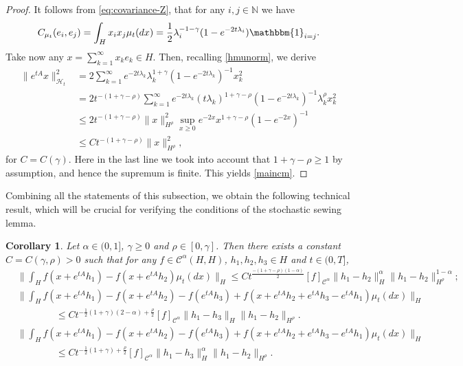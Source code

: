 \documentclass[11pt,a4paper]{article}
\newcommand{\cC}{\mathcal{C}}
\newcommand{\Op}{A}
\renewcommand{\H}{\mathcal{H}}
\newcommand{\I}{\mathbbm{1}}
\newcommand{\N}{\mathbb{N}}
\renewcommand{\ge}{\geqslant}
\renewcommand{\le}{\leqslant}
\numberwithin{equation}{section}
\theoremstyle{definition}
\theoremstyle{remark}
\theoremstyle{plain}
\newtheorem{corollary}[definition]{Corollary}
\begin{document}
\begin{proof}
It follows from \eqref{eq:covariance-Z}, that for any $i,j\in\N$ we have
\begin{equation*}
C_{\mu_t}(e_i,e_j)=\int_H x_i x_j \mu_t (dx)=\frac12\lambda_i^{-1-\gamma}(1-e^{-2t \lambda_i})\I_{i=j}.
\end{equation*}
Take now any $x=\sum_{k=1}^\infty x_k e_k\in H$. 
Then, recalling \eqref{hmunorm}, we derive
\begin{align*}
\|e^{t A} x\|^2_{\H_t}&=2\sum_{k=1}^\infty e^{-2 t \lambda_k}\lambda_k^{1+\gamma}(1-e^{-2t \lambda_k})^{-1} x_k^2\\
&= 2 t^{-(1+\gamma-\rho)}\sum_{k=1}^\infty e^{-2 t \lambda_k}(t \lambda_k)^{1+\gamma-\rho} (1-e^{-2t \lambda_k})^{-1} \lambda_k^{\rho} x_k^2\\
&\le 2  t^{-(1+\gamma-\rho)}\|x\|_{H^\rho}^2 \sup_{x\ge0} e^{-2 x}x^{1+\gamma-\rho} (1-e^{-2x })^{-1} \\
&\le C t^{-(1+\gamma-\rho)}\|x\|_{H^\rho}^2,
\end{align*}
for $C=C(\gamma)$. Here in the last line we took into account that $1+\gamma-\rho\ge1$ by assumption, and hence the supremum is finite. This yields \eqref{maincm}.
\end{proof}

Combining all the statements of this subsection, we obtain the following technical result, which will be crucial for verifying the conditions of the stochastic sewing lemma.

\begin{corollary}\label{cor:Holderreg}
Let $\alpha \in (0,1]$, $\gamma \geqslant 0$ and $\rho \in [0,\gamma]$. Then there exists a constant $C=C(\gamma,\rho)>0$ such that for any $f \in \cC^\alpha(H,H)$, $h_1,h_2,h_3\in H$ and $t \in (0,T]$,
    \begin{align} 
      &\Big\|\int_H f(x+e^{t\Op}h_1)-f(x+e^{t\Op}h_2)\mu_t(dx)\Big\|_{H} \leqslant C t^{\frac{-(1+\gamma-\rho)(1-\alpha)}{2}} [f]_{\mathcal{C}^\alpha}\|h_1-h_2\|_{H}^\alpha\|h_1-h_2\|_{H^\rho}^{1-\alpha};\label{eq:Holderregtwopoint}\\
        &\Big\|\int_H f(x+e^{t\Op}h_1)-f(x+e^{t\Op} h_2)-f(e^{t\Op} h_3) +f(x+e^{t\Op} h_2 +e^{t\Op}h_3-e^{t\Op}h_1) \mu_t(dx)\Big\|_H\nonumber\\
        &\qquad\qquad\leqslant C t^{-\frac12(1+\gamma)(2-\alpha)+\frac\rho2}[f]_{\mathcal{C}^\alpha}\|h_1-h_3\|_{H} \|h_1-h_2\|_{H^\rho}.      \label{eq:fourpoint}\\
        &\Big\|\int_H f(x+e^{t\Op}h_1)-f(x+e^{t\Op} h_2)-f(e^{t\Op} h_3) +f(x+e^{t\Op} h_2 +e^{t\Op}h_3-e^{t\Op}h_1) \mu_t(dx)\Big\|_H\nonumber\\
        &\qquad\qquad\leqslant C t^{-\frac12(1+\gamma)+\frac\rho2}[f]_{\mathcal{C}^\alpha}\|h_1-h_3\|^\alpha_{H} \|h_1-h_2\|_{H^\rho}.      \label{eq:modfourpoint}
    \end{align}
\end{corollary}
\end{document}
